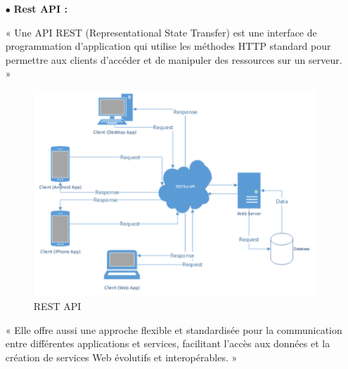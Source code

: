 \begin{itemize}
\bigskip
        \item[$\bullet$] \textbf{  Rest API :}
        \par« Une API REST (Representational State Transfer) est une interface de programmation d'application qui utilise les méthodes HTTP standard pour permettre aux clients d'accéder et de manipuler des ressources sur un serveur. »
       
        \begin{figure}[H]
            \centering\includegraphics[scale=0.51]{chap1.images/rest-api-flow.png}
            \caption{REST API}
            \label{RESTAPI}
        \end{figure}
        « Elle offre aussi une approche flexible et standardisée pour la communication entre différentes applications et services, facilitant l'accès aux données et la création de services Web évolutifs et interopérables. »
    \end{itemize}





